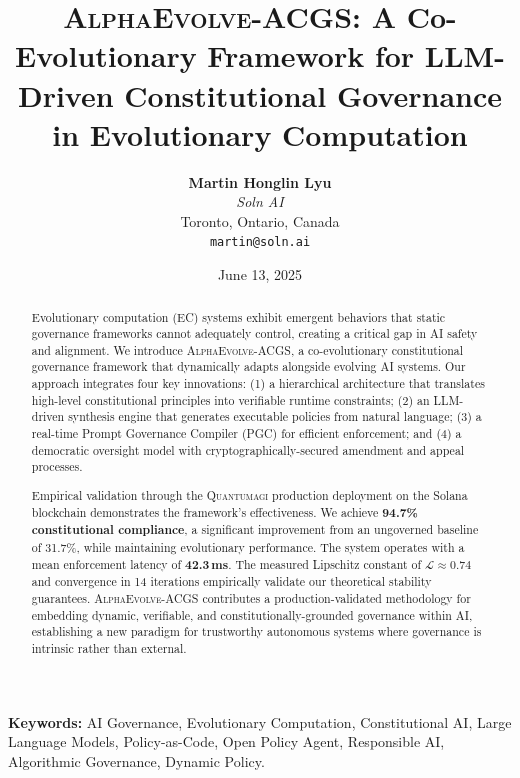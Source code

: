 \documentclass[10pt,twocolumn]{article}
\newcommand{\acgs}{\textsc{AlphaEvolve-ACGS}}
\newcommand{\quantumagi}{\textsc{Quantumagi}}
\newcommand{\lipschitz}{\mathcal{L}}
\theoremstyle{definition}
\begin{document}
\title{\textbf{\acgs{}: A Co-Evolutionary Framework for LLM-Driven Constitutional Governance in Evolutionary Computation}}

\author{
    \textbf{Martin Honglin Lyu}\\
    \textit{Soln AI}\\
    Toronto, Ontario, Canada\\
    \texttt{martin@soln.ai}
}

\date{June 13, 2025}

\maketitle

\begin{abstract}
Evolutionary computation (EC) systems exhibit emergent behaviors that static governance frameworks cannot adequately control, creating a critical gap in AI safety and alignment. We introduce \acgs{}, a co-evolutionary constitutional governance framework that dynamically adapts alongside evolving AI systems. Our approach integrates four key innovations: (1) a hierarchical architecture that translates high-level constitutional principles into verifiable runtime constraints; (2) an LLM-driven synthesis engine that generates executable policies from natural language; (3) a real-time Prompt Governance Compiler (PGC) for efficient enforcement; and (4) a democratic oversight model with cryptographically-secured amendment and appeal processes.

Empirical validation through the \quantumagi{} production deployment on the Solana blockchain demonstrates the framework's effectiveness. We achieve \textbf{94.7\% constitutional compliance}, a significant improvement from an ungoverned baseline of 31.7\%, while maintaining evolutionary performance. The system operates with a mean enforcement latency of \textbf{42.3\,ms}. The measured Lipschitz constant of $\lipschitz \approx 0.74$ and convergence in 14 iterations empirically validate our theoretical stability guarantees. \acgs{} contributes a production-validated methodology for embedding dynamic, verifiable, and constitutionally-grounded governance within AI, establishing a new paradigm for trustworthy autonomous systems where governance is intrinsic rather than external.
\end{abstract}

\textbf{Keywords:} AI Governance, Evolutionary Computation, Constitutional AI, Large Language Models, Policy-as-Code, Open Policy Agent, Responsible AI, Algorithmic Governance, Dynamic Policy.
\end{document}
